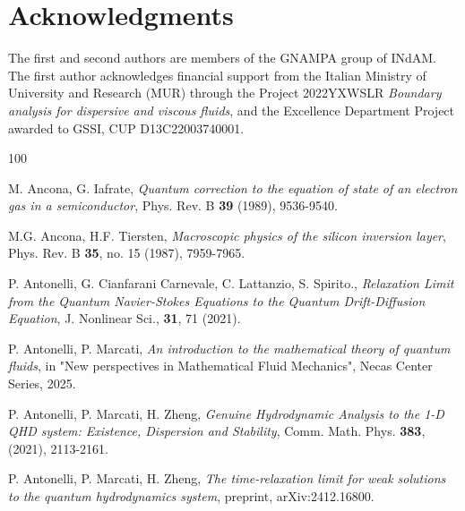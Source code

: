 \documentclass[english]{amsart}
\theoremstyle{plain}
\theoremstyle{definition}
\theoremstyle{remark}
\theoremstyle{plain}
\theoremstyle{plain}
\theoremstyle{plain}
\numberwithin{equation}{section}
\begin{document}
\section*{Acknowledgments}
The first and second authors are members of the GNAMPA group of INdAM. The first author acknowledges financial support from the Italian Ministry of University and Research (MUR) through the Project 2022YXWSLR \emph{Boundary analysis for dispersive and viscous fluids}, and the Excellence Department Project awarded to GSSI, CUP D13C22003740001.


\begin{thebibliography}{100}




 M. Ancona, G. Iafrate, \emph{Quantum correction to the equation of state of an electron gas in a semiconductor}, Phys. Rev. B {\bf 39} (1989), 9536-9540.

 M.G. Ancona, H.F. Tiersten, \emph{Macroscopic physics of the silicon inversion layer}, Phys. Rev. B {\bf 35}, no. 15 (1987), 7959-7965.


 P. Antonelli, G. Cianfarani Carnevale, C. Lattanzio, S. Spirito., \emph{ Relaxation Limit from the Quantum Navier-Stokes Equations to the Quantum Drift-Diffusion Equation}, J. Nonlinear Sci., {\bf 31}, 71 (2021).




 P. Antonelli, P. Marcati, \emph{An introduction to the mathematical theory of quantum fluids}, in "New perspectives in Mathematical Fluid Mechanics", Necas Center Series, 2025.


 P. Antonelli, P. Marcati, H. Zheng,  \textit{Genuine Hydrodynamic Analysis to the 1-D QHD system: Existence, Dispersion and Stability},  Comm. Math. Phys. {\bf 383}, (2021), 2113-2161.

 P. Antonelli, P. Marcati, H. Zheng,  \textit{The time-relaxation limit for weak solutions to the quantum hydrodynamics system}, preprint, arXiv:2412.16800.


\end{thebibliography}
\end{document}
